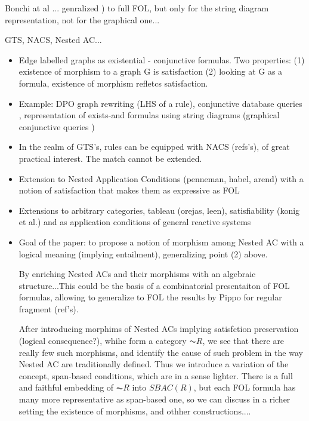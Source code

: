Bonchi at al ... genralized \cite{DBLP:conf/csl/BonchiSS18}) to full FOL, but only for the string diagram representation, not for the graphical one...

GTS, NACS, Nested AC...

\begin{itemize}
    \item Edge labelled graphs  as existential - conjunctive formulas. Two properties: (1) existence of morphism to a graph G is satisfaction (2) looking at G as a formula, existence of morphism refletcs satisfaction.
    \item Example: DPO graph rewriting (LHS of a rule), conjunctive database queries \cite{DBLP:conf/stoc/ChandraM77}, representation of exists-and formulas using string diagrams (graphical conjunctive queries \cite{DBLP:conf/csl/BonchiSS18})
    \item In the realm of GTS's, rules can be equipped with NACS (refs's), of great practical interest. The match cannot be extended. 
    \item Extension to Nested Application Conditions (penneman, habel, arend) with a notion of satisfaction that makes them as expressive as FOL
    \item Extensions to arbitrary categories, tableau (orejas, leen), satisfiability (konig et al.) and as application conditions of general reactive systems
    \item  Goal of the paper: to propose a notion of morphism among Nested AC with a logical meaning (implying entailment), generalizing point (2) above. 
    
    By enriching Nested ACs and their morphisms with an algebraic structure...This could be the basis of a combinatorial presentaiton of FOL formulas, allowing to generalize to FOL the results by Pippo for regular fragment (ref's).
    
    After introducing morphims of Nested ACs implying satisfction preservation (logical consequence?), whihc form a category $\AC{R}$, we see that there are really few such morphisms, and identify the cause of such problem in the way Nested AC are traditionally defined. Thus we introduce a variation of the concept, span-based conditions, which are in a sense lighter. There is a full and faithful embedding of $\AC{R}$ into $SBAC(R)$, but each FOL formula has many more representative as span-based one, so we can discuss in a richer setting the existence of morphisms, and othher constructions....

\end{itemize}
    
